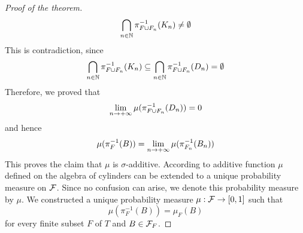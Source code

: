 \begin{proof}[Proof of the theorem]
$$\bigcap_{n\in {\mathbb N}}\pi^{-1}_{F\cup F_n}(K_n) \neq \emptyset$$
This is contradiction, since
$$\bigcap_{n\in {\mathbb N}}\pi^{-1}_{F\cup F_n}(K_n) \subseteq \bigcap_{n\in {\mathbb N}}\pi^{-1}_{F\cup F_n}(D_n) = \emptyset$$
Therefore, we proved that 
$$\lim_{n\rightarrow +\infty}\mu(\pi^{-1}_{F\cup F_n}(D_n)) = 0$$
and hence
$$\mu(\pi_F^{-1}(B)) = \lim_{n\rightarrow +\infty}\mu(\pi^{-1}_{F_n}(B_n))$$
This proves the claim that $\mu$ is $\sigma$-additive. According to {\cite[Theorem 3.3]{Introduction_to_measure_theory}} additive function $\mu$ defined on the algebra of cylinders can be extended to a unique probability measure on ${\mathcal F}$. Since no confusion can arise, we denote this probability measure by $\mu$. We constructed a unique probability measure $\mu:{\mathcal F}\rightarrow [0,1]$ such that 
$$\mu\left(\pi^{-1}_F(B)\right) = \mu_F(B)$$
for every finite subset $F$ of $T$ and $B\in {\mathcal F}_F$.
\end{proof}


\small


